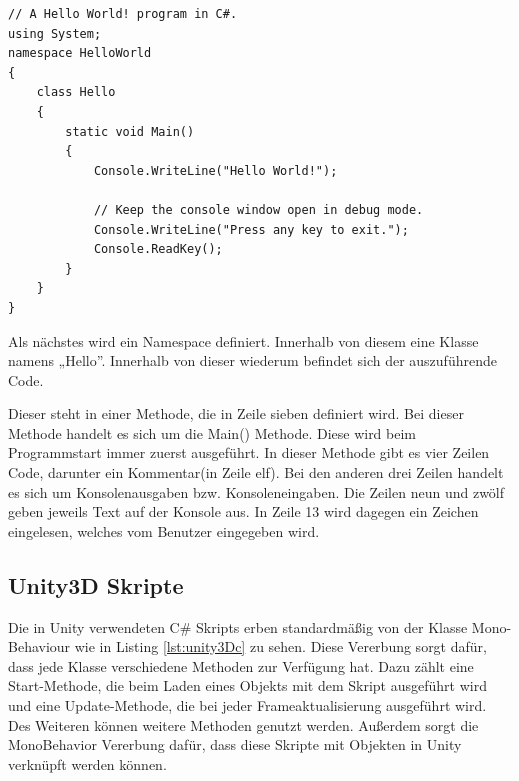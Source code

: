 \begin{scriptsize}
\lstset{
	float,
	caption=Hello World in C\#, 
	language=[Sharp]C, 
	frame=single,  
	showstringspaces=false, 
	showspaces=false, 
	numbers=left, 
	captionpos=b, 
	belowcaptionskip=4pt,
	basicstyle=\ttfamily
} 

\begin{lstlisting}[label=lst:c_helloworld]
// A Hello World! program in C#.
using System;
namespace HelloWorld
{
    class Hello 
    {
        static void Main() 
        {
            Console.WriteLine("Hello World!");

            // Keep the console window open in debug mode.
            Console.WriteLine("Press any key to exit.");
            Console.ReadKey();
        }
    }
}
\end{lstlisting}
\end{scriptsize}

Als nächstes wird ein Namespace definiert. Innerhalb von diesem eine Klasse namens „Hello”. Innerhalb von dieser wiederum befindet sich der auszuführende Code.

Dieser steht in einer Methode, die in Zeile sieben definiert wird. Bei dieser Methode handelt es sich um die Main() Methode. Diese wird beim Programmstart immer zuerst ausgeführt. In dieser Methode gibt es vier Zeilen Code, darunter ein Kommentar(in Zeile elf). Bei den anderen drei Zeilen handelt es sich um Konsolenausgaben bzw. Konsoleneingaben. Die Zeilen neun und zwölf geben jeweils Text auf der Konsole aus. In Zeile 13 wird dagegen ein Zeichen eingelesen, welches vom Benutzer eingegeben wird.

\subsection{Unity3D Skripte}

Die in Unity verwendeten C\# Skripts erben standardmäßig von der Klasse Mono-Behaviour wie in Listing \ref{lst:unity3Dc} zu sehen. Diese Vererbung sorgt dafür, dass jede Klasse verschiedene Methoden zur Verfügung hat. Dazu zählt eine Start-Methode, die beim Laden eines Objekts mit dem Skript ausgeführt wird und eine Update-Methode, die bei jeder Frameaktualisierung ausgeführt wird. Des Weiteren können weitere Methoden genutzt werden. Außerdem sorgt die MonoBehavior Vererbung dafür, dass diese Skripte mit Objekten in Unity verknüpft werden können.

